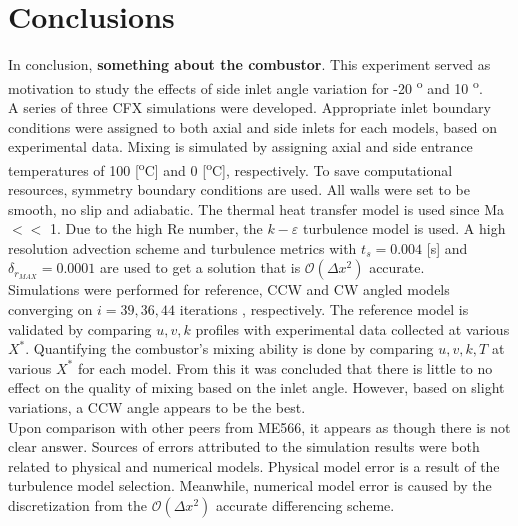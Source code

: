 \chapter{Conclusions}
\label{ch:conc}

In conclusion, \textbf{something about the combustor}. This experiment served as motivation to study the effects of side inlet angle variation for -20 \textsuperscript{o} and 10 \textsuperscript{o}. \\

A series of three CFX simulations were developed. Appropriate inlet boundary conditions were assigned to both axial and side inlets for each models, based on experimental data. Mixing is simulated by assigning  axial and side entrance temperatures of 100 [\textsuperscript{o}C] and 0 [\textsuperscript{o}C], respectively. To save computational resources, symmetry boundary conditions are used. All walls were set to be smooth, no slip and adiabatic. The thermal heat transfer model is used since Ma $<<$ 1. Due to the high Re number, the $k-\varepsilon$ turbulence model is used. A high resolution advection scheme and turbulence metrics with $t_s = 0.004$ [s] and $\delta_{r_{MAX}}=0.0001$ are used to get a solution that is $\mathcal{O}(\Delta x^2)$ accurate.\\

Simulations were performed for reference, CCW and CW angled models converging on $i= 39, 36, 44$ iterations , respectively. The reference model is validated by comparing $u,v,k$ profiles with experimental data collected at various $X^*$. Quantifying the combustor's mixing ability is done by comparing $u,v,k,T$ at various $X^*$ for each model. From this it was concluded that there is little to no effect on the quality of mixing based on the inlet angle. However, based on slight variations, a CCW angle appears to be the best.\\


Upon comparison with other peers from ME566, it appears as though there is not clear answer. Sources of errors attributed to the simulation results were both related to physical and numerical models. Physical model error is a result of the turbulence model selection. Meanwhile, numerical model error is caused by the discretization from the $\mathcal{O}(\Delta x^2)$ accurate differencing scheme.\\
